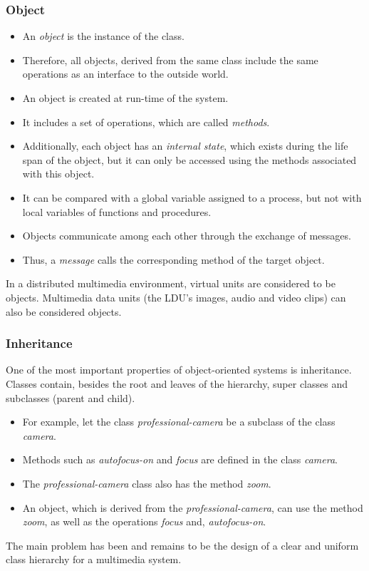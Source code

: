 \begin{multicols}{2}
	\subsubsection{Object}
	\begin{itemize}
		\item An \textit{object} is the instance of the class. 
		\item Therefore, all objects, derived from the same class include the same operations as an interface to the outside world. 
		\item An object is created at run-time of the system. 
		\item It includes a set of operations, which are called \textit{methods}. 
		\item Additionally, each object has an \textit{internal state}, which exists during the life span of the object, but it can only be accessed using the methods associated with this object.
		\item It can be compared with a global variable assigned to a process, but not with local variables of functions and procedures.
		\item Objects communicate among each other through the exchange of messages. 
		\item Thus, a \textit{message} calls the corresponding method of the target object.
	\end{itemize}
\end{multicols}
In a distributed multimedia environment, virtual units are considered to be objects. Multimedia data units (the LDU's images, audio and video clips) can also be considered objects.


\subsubsection{Inheritance}
One of the most important properties of object-oriented systems is inheritance.  Classes contain, besides the root and leaves of the hierarchy, super classes and subclasses (parent and child).
\begin{multicols}{2}
	\begin{itemize}
		\item For example, let the class \textit{professional-camera} be a subclass of the class \textit{camera}. 
		\item Methods such as \textit{autofocus-on} and \textit{focus} are defined in the class \textit{camera}. 
		\item The \textit{professional-camera} class also has the method \textit{zoom}. 
		\item An object, which is derived from the \textit{professional-camera}, can use the method \textit{zoom}, as well as the operations \textit{focus} and, \textit{autofocus-on}.
	\end{itemize}
\end{multicols}
The main problem has been and remains to be the design of a clear and uniform class hierarchy for a multimedia system.

